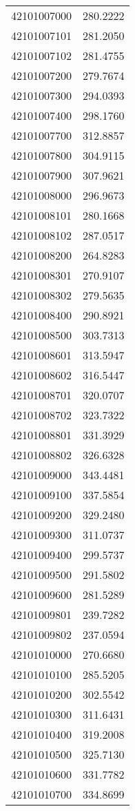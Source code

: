 \begin{longtable}[t]{lr}
42101007000 & 280.2222\\
42101007101 & 281.2050\\
42101007102 & 281.4755\\
42101007200 & 279.7674\\
42101007300 & 294.0393\\
42101007400 & 298.1760\\
42101007700 & 312.8857\\
42101007800 & 304.9115\\
42101007900 & 307.9621\\
42101008000 & 296.9673\\
42101008101 & 280.1668\\
42101008102 & 287.0517\\
42101008200 & 264.8283\\
42101008301 & 270.9107\\
42101008302 & 279.5635\\
42101008400 & 290.8921\\
42101008500 & 303.7313\\
42101008601 & 313.5947\\
42101008602 & 316.5447\\
42101008701 & 320.0707\\
42101008702 & 323.7322\\
42101008801 & 331.3929\\
42101008802 & 326.6328\\
42101009000 & 343.4481\\
42101009100 & 337.5854\\
42101009200 & 329.2480\\
42101009300 & 311.0737\\
42101009400 & 299.5737\\
42101009500 & 291.5802\\
42101009600 & 281.5289\\
42101009801 & 239.7282\\
42101009802 & 237.0594\\
42101010000 & 270.6680\\
42101010100 & 285.5205\\
42101010200 & 302.5542\\
42101010300 & 311.6431\\
42101010400 & 319.2008\\
42101010500 & 325.7130\\
42101010600 & 331.7782\\
42101010700 & 334.8699\\

\end{longtable}
